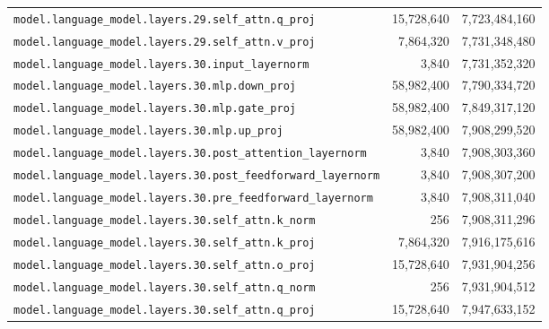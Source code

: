 \documentclass[10pt,a4paper]{article}
\theoremstyle{definition}
\begin{document}
\begin{appendices}
\begin{longtable}{p{9.5cm}rr}
\texttt{model.\allowbreak{}language\_model.\allowbreak{}layers.\allowbreak{}29.\allowbreak{}self\_attn.\allowbreak{}q\_proj} & 15,728,640 & 7,723,484,160 \\
\texttt{model.\allowbreak{}language\_model.\allowbreak{}layers.\allowbreak{}29.\allowbreak{}self\_attn.\allowbreak{}v\_proj} & 7,864,320 & 7,731,348,480 \\
\texttt{model.\allowbreak{}language\_model.\allowbreak{}layers.\allowbreak{}30.\allowbreak{}input\_layernorm} & 3,840 & 7,731,352,320 \\
\texttt{model.\allowbreak{}language\_model.\allowbreak{}layers.\allowbreak{}30.\allowbreak{}mlp.\allowbreak{}down\_proj} & 58,982,400 & 7,790,334,720 \\
\texttt{model.\allowbreak{}language\_model.\allowbreak{}layers.\allowbreak{}30.\allowbreak{}mlp.\allowbreak{}gate\_proj} & 58,982,400 & 7,849,317,120 \\
\texttt{model.\allowbreak{}language\_model.\allowbreak{}layers.\allowbreak{}30.\allowbreak{}mlp.\allowbreak{}up\_proj} & 58,982,400 & 7,908,299,520 \\
\texttt{model.\allowbreak{}language\_model.\allowbreak{}layers.\allowbreak{}30.\allowbreak{}post\_attention\_layernorm} & 3,840 & 7,908,303,360 \\
\texttt{model.\allowbreak{}language\_model.\allowbreak{}layers.\allowbreak{}30.\allowbreak{}post\_feedforward\_layernorm} & 3,840 & 7,908,307,200 \\
\texttt{model.\allowbreak{}language\_model.\allowbreak{}layers.\allowbreak{}30.\allowbreak{}pre\_feedforward\_layernorm} & 3,840 & 7,908,311,040 \\
\texttt{model.\allowbreak{}language\_model.\allowbreak{}layers.\allowbreak{}30.\allowbreak{}self\_attn.\allowbreak{}k\_norm} & 256 & 7,908,311,296 \\
\texttt{model.\allowbreak{}language\_model.\allowbreak{}layers.\allowbreak{}30.\allowbreak{}self\_attn.\allowbreak{}k\_proj} & 7,864,320 & 7,916,175,616 \\
\texttt{model.\allowbreak{}language\_model.\allowbreak{}layers.\allowbreak{}30.\allowbreak{}self\_attn.\allowbreak{}o\_proj} & 15,728,640 & 7,931,904,256 \\
\texttt{model.\allowbreak{}language\_model.\allowbreak{}layers.\allowbreak{}30.\allowbreak{}self\_attn.\allowbreak{}q\_norm} & 256 & 7,931,904,512 \\
\texttt{model.\allowbreak{}language\_model.\allowbreak{}layers.\allowbreak{}30.\allowbreak{}self\_attn.\allowbreak{}q\_proj} & 15,728,640 & 7,947,633,152 \\

\end{longtable}
\end{appendices}
\end{document}
